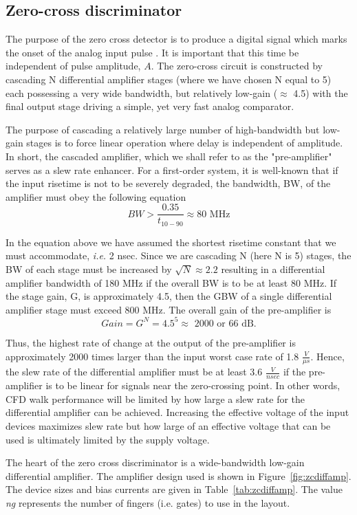 \documentclass[12pt,oneside,final]{siuethesis}
\theoremstyle{definition}
\begin{document}
\subsection{Zero-cross discriminator}
\par The purpose of the zero cross detector is to produce a digital signal which marks the onset of the analog input pulse \cite{474405}. It is important that this time be independent of pulse amplitude, $A$.  The zero-cross circuit is constructed by cascading N differential amplifier stages (where we have chosen N equal to 5) each possessing a very wide bandwidth, but relatively low-gain ($\approx$ 4.5) with the final output stage driving a simple, yet very fast analog comparator.
\par The purpose of cascading a relatively large number of high-bandwidth but low-gain stages is to force linear operation where delay is independent of amplitude. In short, the cascaded amplifier, which we shall refer to as the "pre-amplifier" serves as a slew rate enhancer.  For a first-order system, it is well-known that if the input risetime is not to be severely degraded, the bandwidth, BW, of the amplifier must obey the following equation
\begin{equation}
BW > \frac{0.35}{t_{10-90}} \approx \text{80 MHz}
\end{equation}
\par In the equation above we have assumed the shortest risetime constant that we must accommodate, \emph{i.e.}  2 nsec. Since we are cascading N (here N is 5) stages, the BW of each stage must be increased by $\sqrt{N} \approx 2.2$ resulting in a differential amplifier bandwidth of 180 MHz if the overall BW is to be at least 80 MHz.  If the stage gain, G, is approximately 4.5, then the GBW of a single differential amplifier stage must exceed 800 MHz. The overall gain of the pre-amplifier is
\begin{equation}
Gain = G^N = 4.5^5 \approx \text{ 2000 or 66 dB}.
\end{equation}
\par Thus, the highest rate of change at the output of the pre-amplifier is approximately 2000 times larger than the input worst case rate of 1.8 $\frac{V}{\mu s}$.  Hence, the slew rate of the differential amplifier must be at least 3.6 $\frac{V}{nsec}$ if the pre-amplifier is to be linear for signals near the zero-crossing point. In other words, CFD walk performance will be limited by how large a slew rate for the differential amplifier can be achieved. Increasing the effective voltage of the input devices maximizes slew rate but how large of an effective voltage that can be used is ultimately limited by the supply voltage.
\par The heart of the zero cross discriminator is a wide-bandwidth low-gain differential amplifier. The amplifier design used is shown in Figure~\ref{fig:zcdiffamp}. The device sizes and bias currents are given in Table~\ref{tab:zcdiffamp}. The value \emph{ng} represents the number of fingers (i.e. gates) to use in the layout.
\end{document}
